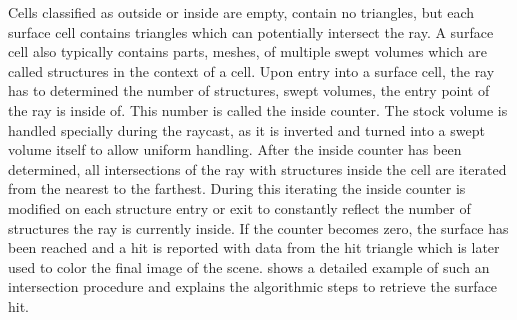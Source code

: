 Cells classified as outside or inside are empty, \ie contain no triangles, but each surface cell contains triangles which can potentially intersect the ray.
A surface cell also typically contains parts, \ie meshes, of multiple swept volumes which are called structures in the context of a cell.
Upon entry into a surface cell, the ray has to determined the number of structures, \ie swept volumes, the entry point of the ray is inside of.
This number is called the inside counter.
The stock volume is handled specially during the raycast, as it is inverted and turned into a swept volume itself to allow uniform handling.
After the inside counter has been determined, all intersections of the ray with structures inside the cell are iterated from the nearest to the farthest.
During this iterating the inside counter is modified on each structure entry or exit to constantly reflect the number of structures the ray is currently inside.
If the counter becomes zero, the surface has been reached and a hit is reported with data from the hit triangle which is later used to color the final image of the scene.
 shows a detailed example of such an intersection procedure and explains the algorithmic steps to retrieve the surface hit.

